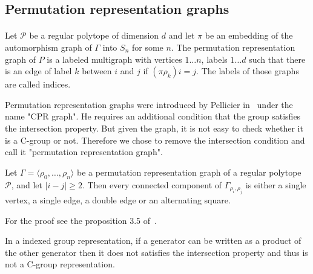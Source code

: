 \subsection{Permutation representation graphs}

\paragraph{}

\begin{definition}
  Let $\mathcal P$ be a regular polytope of dimension $d$ and let $\pi$ be an embedding of the automorphism graph of $\Gamma$ into $S_n$ for some $n$. The permutation representation graph of $P$ is a labeled multigraph with vertices ${1 \dots n}$, labels ${1 \dots d}$ such that there is an edge of label $k$ between $i$ and $j$ if $(\pi \rho_k)i = j$. The labels of those graphs are called indices.
\end{definition}

Permutation representation graphs were introduced by Pellicier in~\cite{cprGraph} under the name "CPR graph". He requires an additional condition that the group satisfies the intersection property. But given the graph, it is not easy to check whether it is a C-group or not. Therefore we chose to remove the intersection condition and call it "permutation representation graph".

\begin{property}
  \label{intersection-patterns}
  Let $\Gamma = \langle \rho_0, \dots, \rho_n \rangle$ be a permutation representation graph of a regular polytope $\mathcal P$, and let $|i - j| \ge 2$. Then every connected component of $\Gamma_{\rho_i,\rho_j}$ is either a single vertex, a single edge, a double edge or an alternating square.
\end{property}

For the proof see the proposition 3.5 of~\cite{cprGraph}.

\begin{property}
  \label{generators-not-free}
  In a indexed group representation, if a generator can be written as a product of the other generator then it does not satisfies the intersection property and thus is not a C-group representation.
\end{property}
